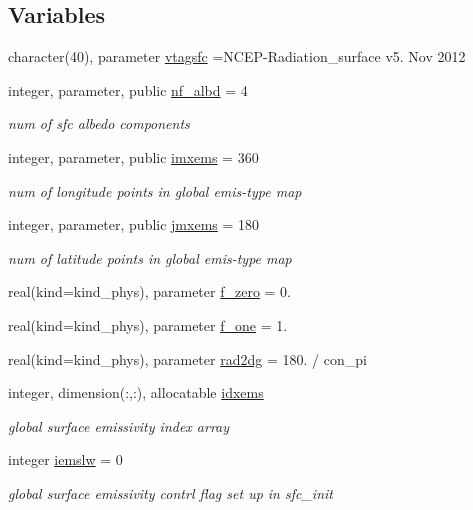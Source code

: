 \subsection*{Variables}
\begin{DoxyCompactItemize}
\item 
character(40), parameter \hyperlink{namespacemodule__radiation__surface_ab0b8c10a0fb6be2644fdf91e3fe1fc5c}{vtagsfc} =\textquotesingle{}N\+C\+EP-\/Radiation\+\_\+surface v5. Nov 2012 \textquotesingle{}
\item 
integer, parameter, public \hyperlink{namespacemodule__radiation__surface_ab7800982c900bd632ca74d5e7d2b5ab3}{nf\+\_\+albd} = 4
\begin{DoxyCompactList}\small\item\em num of sfc albedo components \end{DoxyCompactList}\item 
integer, parameter, public \hyperlink{namespacemodule__radiation__surface_aab4b9853c71ff40f8db2aa78b7cab265}{imxems} = 360
\begin{DoxyCompactList}\small\item\em num of longitude points in global emis-\/type map \end{DoxyCompactList}\item 
integer, parameter, public \hyperlink{namespacemodule__radiation__surface_a3922674f1c727d517ba5b0f7f5093970}{jmxems} = 180
\begin{DoxyCompactList}\small\item\em num of latitude points in global emis-\/type map \end{DoxyCompactList}\item 
real(kind=kind\+\_\+phys), parameter \hyperlink{namespacemodule__radiation__surface_a86e4f42e46e188303b9a8e4d503d1acb}{f\+\_\+zero} = 0.
\item 
real(kind=kind\+\_\+phys), parameter \hyperlink{namespacemodule__radiation__surface_a91cec823f595387c92d659d89f307f42}{f\+\_\+one} = 1.
\item 
real(kind=kind\+\_\+phys), parameter \hyperlink{namespacemodule__radiation__surface_ab879c7cf4e0774089a626e54226e4c1b}{rad2dg} = 180. / con\+\_\+pi
\item 
integer, dimension(\+:,\+:), allocatable \hyperlink{namespacemodule__radiation__surface_ac33f1f3441f8336d7eb7e15cba26caf7}{idxems}
\begin{DoxyCompactList}\small\item\em global surface emissivity index array \end{DoxyCompactList}\item 
integer \hyperlink{namespacemodule__radiation__surface_a3ceebb99dbffcb70a14cfcaa7b029abc}{iemslw} = 0
\begin{DoxyCompactList}\small\item\em global surface emissivity contrl flag set up in \textquotesingle{}sfc\+\_\+init\textquotesingle{} \end{DoxyCompactList}\end{DoxyCompactItemize}


